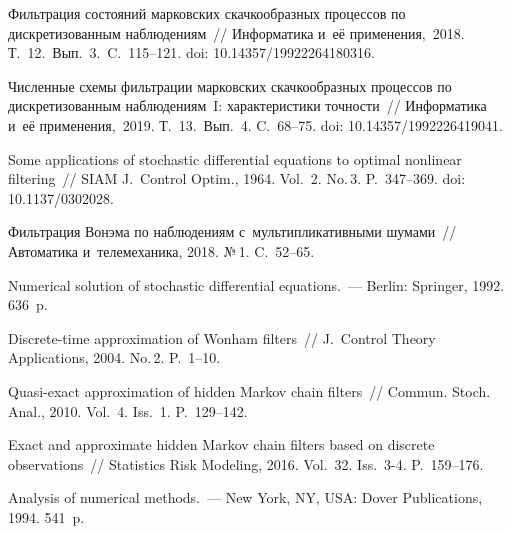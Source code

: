 \begin{multicols}{2}
 \vspace*{-9pt}
 
{\small\frenchspacing
 {%
 \begin{thebibliography}{9}
   Фильтрация состояний марковских скачкообразных процессов 
  по дискретизованным наблюдениям~// Информатика и~её применения,~2018. 
  Т.~12.~Вып.~3.~C.~115--121. doi: 10.14357/19922264180316.

   Численные схемы фильтрации марковских скачкообразных 
  процессов по дискретизованным наблюдениям~I:  характеристики точности~// 
  Информатика и~её применения,~2019. Т.~13.~Вып.~4. C.~68--75. 
  doi: 10.14357/1992226419041.

 Some applications of stochastic differential 
equations to optimal nonlinear
filtering~// SIAM J.~Control Optim., 1964. Vol.~2. No.\,3. P.~347--369. doi: 
10.1137/0302028.

 Фильтрация Вонэма по наблюдениям с~мультипликативными шумами~// 
Автоматика и~телемеханика, 2018.
№\,1. C.~52--65. %

 Numerical solution of stochastic differential 
equations.~--- Berlin: Springer, 1992. 636~p. %

Discrete-time approximation of Wonham filters~//
J.~Control Theory Applications, 2004. No.\,2. P.~1--10.

Quasi-exact approximation of hidden Markov chain filters~// 
Commun. Stoch. Anal., 2010. Vol.~4. Iss.~1. P.~129--142.

Exact and approximate hidden Markov chain filters based on discrete 
observations~// Statistics Risk Modeling, 2016. Vol.~32. Iss.~3-4.
P.~159--176.

 Analysis of numerical methods.~--- 
New York, NY, USA: Dover Publications, 1994. 541~p.
 \end{thebibliography}

 }
 }

\end{multicols}

\vspace*{-3pt}

